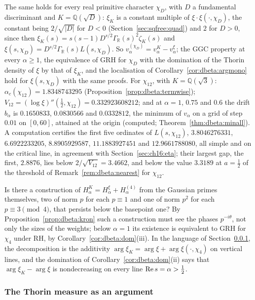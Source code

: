 The same holds for every real primitive character $\chi_D$, with $D$ a fundamental discriminant and $K=\mathbb Q(\sqrt D)$: $\xi_K$ is a constant multiple of $\xi\cdot\xi(\cdot,\chi_D)$, the constant being $2/\sqrt{|D|}$ for $D<0$ (Section~\ref{sec:sqfree:quad}) and $2$ for $D>0$, since then $\xi_K(s)=s(s-1)D^{s/2}\Gamma_{\mathbb R}(s)^2\zeta_K(s)$ and $\xi(s,\chi_D)=D^{s/2}\Gamma_{\mathbb R}(s)L(s,\chi_D)$. So $v^{(\chi_D)}_\alpha=v^K_\alpha-v^\xi_\alpha$; the GGC property at every $\alpha\ge1$, the equivalence of GRH for $\chi_D$ with the domination of the Thorin density of $\xi$ by that of $\xi_K$, and the localisation of Corollary~\ref{cor:dbeta:argmono} hold for $\xi(s,\chi_D)$ with the same proofs. For $\chi_{12}$, with $K=\mathbb Q(\sqrt3)$: $\alpha_c(\chi_{12})=1.8348743295$ (Proposition~\ref{prop:dbeta:termwise}); $V_{12}=(\log\xi)''(\frac12,\chi_{12})=0.332923608212$; and at $\alpha=1$, $0.75$ and $0.6$ the drift $b_\alpha$ is $0.1650833$, $0.0830566$ and $0.0332812$, the minimum of $v_\alpha$ on a grid of step $0.01$ on $[0,60]$, attained at the origin (computed; Theorem~\ref{thm:dbeta:minall}). A computation certifies the first five ordinates of $L(s,\chi_{12})$, $3.8046276331$, $6.6922233205$, $8.8905929587$, $11.1883927451$ and $12.9661788080$, all simple and on the critical line, in agreement with Section~\ref{sec:ch16:eta}; their largest gap, the first, $2.8876$, lies below $2/\sqrt{V_{12}}=3.4662$, and below the value $3.3189$ at $a=\frac12$ of the threshold of Remark~\ref{rem:dbeta:nearest} for $\chi_{12}$.

\begin{question}\label{q:dbeta:coupling}
Is there a construction of $H^K_\alpha=H^\xi_\alpha+H^{(4)}_\alpha$ from the Gaussian primes themselves, two of norm $p$ for each $p\equiv1$ and one of norm $p^2$ for each $p\equiv3\pmod4$, that persists below the basepoint one? By Proposition~\ref{prop:dbeta:kron} such a construction must see the phases $p^{-i\theta}$, not only the sizes of the weights; below $\alpha=1$ its existence is equivalent to GRH for $\chi_4$ under RH, by Corollary~\ref{cor:dbeta:dom}(iii). In the language of Section~\ref{sec:dbeta:arg}, the decomposition is the additivity $\arg\xi_K=\arg\xi+\arg\xi(\cdot,\chi_4)$ on vertical lines, and the domination of Corollary~\ref{cor:dbeta:dom}(ii) says that $\arg\xi_K-\arg\xi$ is nondecreasing on every line $\operatorname{Re} s=\alpha>\frac12$.
\end{question}

\subsubsection{The Thorin measure as an argument}\label{sec:dbeta:arg}

